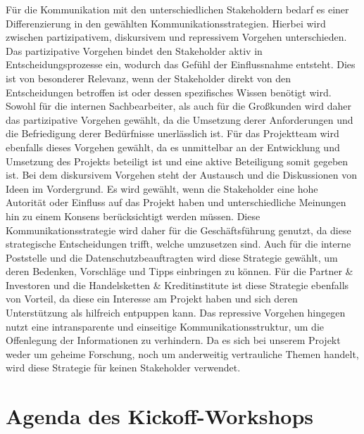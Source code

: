 Für die Kommunikation mit den unterschiedlichen Stakeholdern bedarf es einer Differenzierung in den gewählten Kommunikationsstrategien. Hierbei wird zwischen partizipativem, diskursivem und repressivem Vorgehen unterschieden. Das partizipative Vorgehen bindet den Stakeholder aktiv in Entscheidungsprozesse ein, wodurch das Gefühl der Einflussnahme entsteht. Dies ist von besonderer Relevanz, wenn der Stakeholder direkt von den Entscheidungen betroffen ist oder dessen spezifisches Wissen benötigt wird. Sowohl für die internen Sachbearbeiter, als auch für die Großkunden wird daher das partizipative Vorgehen gewählt, da die Umsetzung derer Anforderungen und die Befriedigung derer Bedürfnisse unerlässlich ist. Für das Projektteam wird ebenfalls dieses Vorgehen gewählt, da es unmittelbar an der Entwicklung und Umsetzung des Projekts beteiligt ist und eine aktive Beteiligung somit gegeben ist. Bei dem diskursivem Vorgehen steht der Austausch und die Diskussionen von Ideen im Vordergrund. Es wird gewählt, wenn die Stakeholder eine hohe Autorität oder Einfluss auf das Projekt haben und unterschiedliche Meinungen hin zu einem Konsens berücksichtigt werden müssen. Diese Kommunikationsstrategie wird daher für die Geschäftsführung genutzt, da diese strategische Entscheidungen trifft, welche umzusetzen sind. Auch für die interne Poststelle und die Datenschutzbeauftragten wird diese Strategie gewählt, um deren Bedenken, Vorschläge und Tipps einbringen zu können. Für die Partner \& Investoren und die Handelsketten \& Kreditinstitute ist diese Strategie ebenfalls von Vorteil, da diese ein Interesse am Projekt haben und sich deren Unterstützung als hilfreich entpuppen kann. Das repressive Vorgehen hingegen nutzt eine intransparente und einseitige Kommunikationsstruktur, um die Offenlegung der Informationen zu verhindern. Da es sich bei unserem Projekt weder um geheime Forschung, noch um anderweitig vertrauliche Themen handelt, wird diese Strategie für keinen Stakeholder verwendet.


\section{Agenda des Kickoff-Workshops}

